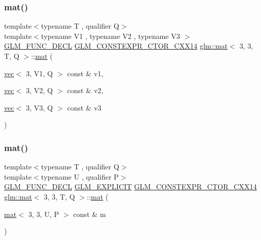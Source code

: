 \mbox{\label{structglm_1_1mat_3_013_00_013_00_01_t_00_01_q_01_4_ae25c721fb8fd4496b8430fc9040b04be}} 
\subsubsection{\texorpdfstring{mat()}{mat()}\hspace{0.1cm}{\footnotesize\ttfamily [8/21]}}
{\footnotesize\ttfamily template$<$typename T , qualifier Q$>$ \\
template$<$typename V1 , typename V2 , typename V3 $>$ \\
\hyperlink{setup_8hpp_ab2d052de21a70539923e9bcbf6e83a51}{G\+L\+M\+\_\+\+F\+U\+N\+C\+\_\+\+D\+E\+CL} \hyperlink{setup_8hpp_a0900f9145e68bf6061b6f5e7be3fa751}{G\+L\+M\+\_\+\+C\+O\+N\+S\+T\+E\+X\+P\+R\+\_\+\+C\+T\+O\+R\+\_\+\+C\+X\+X14} \hyperlink{structglm_1_1mat}{glm\+::mat}$<$ 3, 3, T, Q $>$\+::\hyperlink{structglm_1_1mat}{mat} (\begin{DoxyParamCaption}\item[{\hyperlink{structglm_1_1vec}{vec}$<$ 3, V1, Q $>$ const \&}]{v1,  }\item[{\hyperlink{structglm_1_1vec}{vec}$<$ 3, V2, Q $>$ const \&}]{v2,  }\item[{\hyperlink{structglm_1_1vec}{vec}$<$ 3, V3, Q $>$ const \&}]{v3 }\end{DoxyParamCaption})}

\mbox{\label{structglm_1_1mat_3_013_00_013_00_01_t_00_01_q_01_4_aaaa9738e2310481af8ab062744c2c426}} 
\subsubsection{\texorpdfstring{mat()}{mat()}\hspace{0.1cm}{\footnotesize\ttfamily [9/21]}}
{\footnotesize\ttfamily template$<$typename T , qualifier Q$>$ \\
template$<$typename U , qualifier P$>$ \\
\hyperlink{setup_8hpp_ab2d052de21a70539923e9bcbf6e83a51}{G\+L\+M\+\_\+\+F\+U\+N\+C\+\_\+\+D\+E\+CL} \hyperlink{setup_8hpp_a6c74f5a5e7b134ab69023ff9a30d4d5d}{G\+L\+M\+\_\+\+E\+X\+P\+L\+I\+C\+IT} \hyperlink{setup_8hpp_a0900f9145e68bf6061b6f5e7be3fa751}{G\+L\+M\+\_\+\+C\+O\+N\+S\+T\+E\+X\+P\+R\+\_\+\+C\+T\+O\+R\+\_\+\+C\+X\+X14} \hyperlink{structglm_1_1mat}{glm\+::mat}$<$ 3, 3, T, Q $>$\+::\hyperlink{structglm_1_1mat}{mat} (\begin{DoxyParamCaption}\item[{\hyperlink{structglm_1_1mat}{mat}$<$ 3, 3, U, P $>$ const \&}]{m }\end{DoxyParamCaption})}

